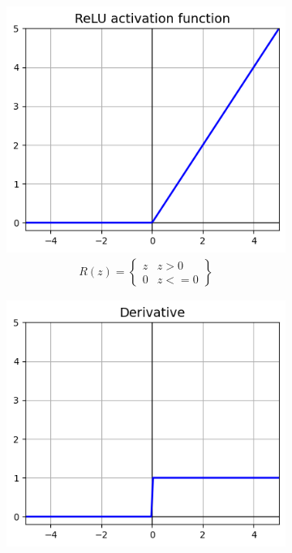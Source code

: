 \begin{figure}[H]
  \centering
  \begin{subfigure}{0.5\textwidth}
      \centering
      \includegraphics[width=0.9\linewidth]{fig/actfunc_relu.png}
      \caption{%
          \begin{equation}
              \begin{split}R(z) =
                  \begin{Bmatrix}
                      z & z > 0  \\
                      0 & z <= 0
                  \end{Bmatrix}
              \end{split}
          \end{equation}
      }
      \label{fig:actfunc_relu}
  \end{subfigure}%
  \begin{subfigure}{0.5\textwidth}
      \centering
      \includegraphics[width=0.9\linewidth]{fig/actfunc_relu_der.png}

\end{subfigure}
\end{figure}
